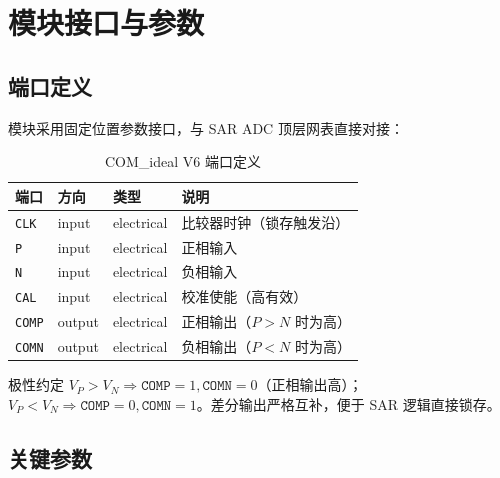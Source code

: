 \documentclass[UTF8,a4paper,11pt]{ctexart}
\newcommand{\code}[1]{\texttt{#1}}
\begin{document}
\section{模块接口与参数}

\subsection{端口定义}

模块采用固定位置参数接口，与 SAR ADC 顶层网表直接对接：

\begin{table}[H]
\centering
\caption{COM\_ideal V6 端口定义}
\label{tab:ports}
\small
\begin{tabularx}{\textwidth}{l l l X}
\toprule
端口 & 方向 & 类型 & 说明 \\
\midrule
\code{CLK} & input & electrical & 比较器时钟（锁存触发沿） \\
\code{P} & input & electrical & 正相输入 \\
\code{N} & input & electrical & 负相输入 \\
\code{CAL} & input & electrical & 校准使能（高有效） \\
\code{COMP} & output & electrical & 正相输出（$P>N$ 时为高） \\
\code{COMN} & output & electrical & 负相输出（$P<N$ 时为高） \\
\bottomrule
\end{tabularx}
\end{table}

\begin{notebox}{极性约定}
$V_P > V_N \Rightarrow \code{COMP}=1, \code{COMN}=0$（正相输出高）；$V_P < V_N \Rightarrow \code{COMP}=0, \code{COMN}=1$。差分输出严格互补，便于 SAR 逻辑直接锁存。
\end{notebox}

\subsection{关键参数}
\end{document}
